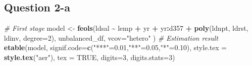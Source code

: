 \documentclass[
]{article}
\newenvironment{Shaded}{\begin{snugshade}}{\end{snugshade}}
\newcommand{\AttributeTok}[1]{\textcolor[rgb]{0.13,0.29,0.53}{#1}}
\newcommand{\CommentTok}[1]{\textcolor[rgb]{0.56,0.35,0.01}{\textit{#1}}}
\newcommand{\ConstantTok}[1]{\textcolor[rgb]{0.56,0.35,0.01}{#1}}
\newcommand{\DecValTok}[1]{\textcolor[rgb]{0.00,0.00,0.81}{#1}}
\newcommand{\FloatTok}[1]{\textcolor[rgb]{0.00,0.00,0.81}{#1}}
\newcommand{\FunctionTok}[1]{\textcolor[rgb]{0.13,0.29,0.53}{\textbf{#1}}}
\newcommand{\NormalTok}[1]{#1}
\newcommand{\OtherTok}[1]{\textcolor[rgb]{0.56,0.35,0.01}{#1}}
\newcommand{\SpecialCharTok}[1]{\textcolor[rgb]{0.81,0.36,0.00}{\textbf{#1}}}
\newcommand{\StringTok}[1]{\textcolor[rgb]{0.31,0.60,0.02}{#1}}
\begin{document}
\hypertarget{question-2-a}{%
\subsection{Question 2-a}\label{question-2-a}}

\begin{Shaded}
\begin{Highlighting}[]
\CommentTok{\# First stage}
\NormalTok{model }\OtherTok{\textless{}{-}} \FunctionTok{feols}\NormalTok{(ldsal }\SpecialCharTok{\textasciitilde{}}\NormalTok{  lemp }\SpecialCharTok{+}\NormalTok{ yr }\SpecialCharTok{+}\NormalTok{ yr}\SpecialCharTok{:}\NormalTok{d357 }\SpecialCharTok{+} \FunctionTok{poly}\NormalTok{(ldnpt, ldrst, ldinv, }\AttributeTok{degree=}\DecValTok{2}\NormalTok{), }
\NormalTok{               unbalanced\_df, }\AttributeTok{vcov=}\StringTok{"hetero"}
\NormalTok{)}
\CommentTok{\# Estimation result}
\FunctionTok{etable}\NormalTok{(model, }
       \AttributeTok{signif.code=}\FunctionTok{c}\NormalTok{(}\StringTok{"***"}\OtherTok{=}\FloatTok{0.01}\NormalTok{,}\StringTok{"**"}\OtherTok{=}\FloatTok{0.05}\NormalTok{,}\StringTok{"*"}\OtherTok{=}\FloatTok{0.10}\NormalTok{), }
       \AttributeTok{style.tex =} \FunctionTok{style.tex}\NormalTok{(}\StringTok{"aer"}\NormalTok{),  }\AttributeTok{tex =} \ConstantTok{TRUE}\NormalTok{,}
       \AttributeTok{digits=}\DecValTok{3}\NormalTok{, }
       \AttributeTok{digits.stats=}\DecValTok{3}\NormalTok{)}
\end{Highlighting}
\end{Shaded}
\end{document}
